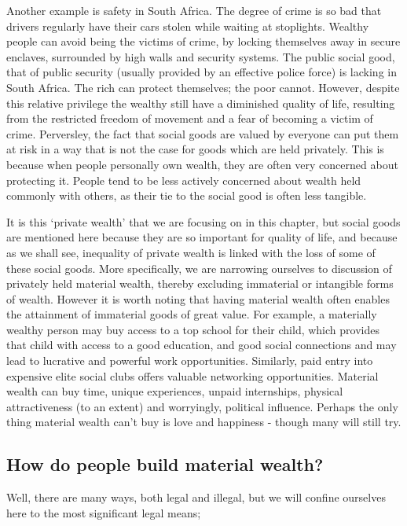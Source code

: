 \documentclass[]{tufte-handout}
\begin{document}
Another example is safety in South Africa. The degree of crime is so bad
that drivers regularly have their cars stolen while waiting at
stoplights. Wealthy people can avoid being the victims of crime, by
locking themselves away in secure enclaves, surrounded by high walls and
security systems. The public social good, that of public security
(usually provided by an effective police force) is lacking in South
Africa. The rich can protect themselves; the poor cannot. However,
despite this relative privilege the wealthy still have a diminished
quality of life, resulting from the restricted freedom of movement and a
fear of becoming a victim of crime. Perversley, the fact that social
goods are valued by everyone can put them at risk in a way that is not
the case for goods which are held privately. This is because when people
personally own wealth, they are often very concerned about protecting
it. People tend to be less actively concerned about wealth held commonly
with others, as their tie to the social good is often less tangible.

It is this `private wealth' that we are focusing on in this chapter, but
social goods are mentioned here because they are so important for
quality of life, and because as we shall see, inequality of private
wealth is linked with the loss of some of these social goods. More
specifically, we are narrowing ourselves to discussion of privately held
material wealth, thereby excluding immaterial or intangible forms of
wealth. However it is worth noting that having material wealth often
enables the attainment of immaterial goods of great value. For example,
a materially wealthy person may buy access to a top school for their
child, which provides that child with access to a good education, and
good social connections and may lead to lucrative and powerful work
opportunities. Similarly, paid entry into expensive elite social clubs
offers valuable networking opportunities. Material wealth can buy time,
unique experiences, unpaid internships, physical attractiveness (to an
extent) and worryingly, political influence. Perhaps the only thing
material wealth can't buy is love and happiness - though many will still
try.

\hypertarget{how-do-people-build-material-wealth}{%
\subsection{How do people build material
wealth?}\label{how-do-people-build-material-wealth}}

Well, there are many ways, both legal and illegal, but we will confine
ourselves here to the most significant legal means;
\end{document}
